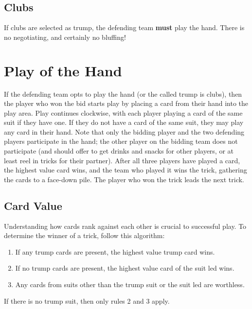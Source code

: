 \documentclass[11pt]{article}
\providecommand{\tightlist}{%
  \setlength{\itemsep}{0pt}%
  \setlength{\parskip}{0pt}%
}
\begin{document}
\subsection{Clubs}\label{clubs}

If clubs are selected as trump, the defending team \textbf{must} play
the hand. There is no negotiating, and certainly no bluffing!

\section{Play of the Hand}\label{play-of-the-hand}

If the defending team opts to play the hand (or the called trump is
clubs), then the player who won the bid starts play by placing a card
from their hand into the play area. Play continues clockwise, with each
player playing a card of the same suit if they have one. If they do not
have a card of the same suit, they may play any card in their hand. Note
that only the bidding player and the two defending players participate
in the hand; the other player on the bidding team does not participate
(and should offer to get drinks and snacks for other players, or at
least reel in tricks for their partner). After all three players have
played a card, the highest value card wins, and the team who played it
wins the trick, gathering the cards to a face-down pile. The player who
won the trick leads the next trick.

\subsection{Card Value}\label{card-value}

Understanding how cards rank against each other is crucial to successful
play. To determine the winner of a trick, follow this algorithm:

\begin{enumerate}
\def\labelenumi{\arabic{enumi}.}
\tightlist
\item
  If any trump cards are present, the highest value trump card wins.
\item
  If no trump cards are present, the highest value card of the suit led
  wins.
\item
  Any cards from suits other than the trump suit or the suit led are
  worthless.
\end{enumerate}

If there is no trump suit, then only rules 2 and 3 apply.
\end{document}
